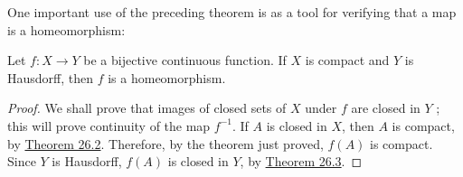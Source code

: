 One important use of the preceding theorem is as a tool for verifying that a map is a homeomorphism:

\begin{theorem}
\label{thm:\thetheorem}
 Let \(f : X \rightarrow Y\) be a bijective continuous function. If \(X\) is compact and \(Y\) is Hausdorff, then \(f\) is a homeomorphism.

\end{theorem}
\begin{proof}
 We shall prove that images of closed sets of \(X\) under \(f\) are closed in \(Y\) ; this will prove continuity of the map \(f^{-1}\). If \(A\) is closed in \(X\), then \(A\) is compact, by \hyperref[thm:26.2]{Theorem 26.2}. Therefore, by the theorem just proved, \(f( A)\) is compact. Since \(Y\) is Hausdorff, \(f( A)\) is closed in \(Y\), by \hyperref[thm:26.3]{Theorem 26.3}.
\end{proof}

